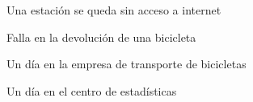\begin{subsection}{Una estación se queda sin acceso a internet}

\end{subsection}

\begin{subsection}{Falla en la devolución de una bicicleta}

\end{subsection} 

\begin{subsection}{Un día en la empresa de transporte de bicicletas}

\end{subsection}

\begin{subsection}{Un día en el centro de estadísticas}

\end{subsection}